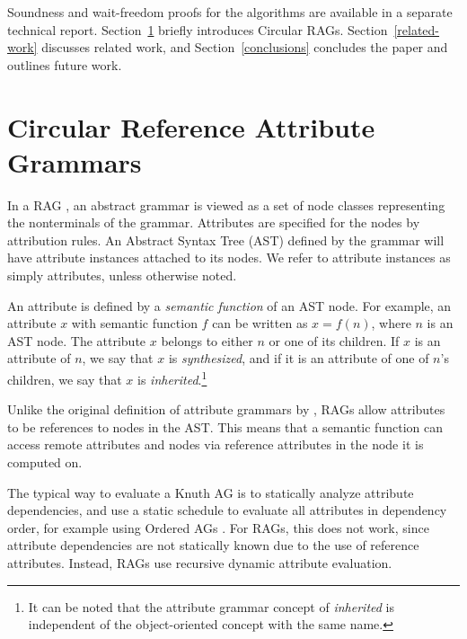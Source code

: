 {Soundness and wait-freedom proofs for the algorithms are available in a separate technical report.
Section~\ref{rags-background} briefly introduces Circular RAGs.
Section~\ref{related-work} discusses related work, and Section~\ref{conclusions} concludes the paper and outlines future work.


\section{Circular Reference Attribute Grammars}
\label{rags-background}


In a RAG \cite{DBLP:journals/informaticaSI/Hedin00}, an abstract grammar is
viewed as a set of node classes representing the nonterminals of the grammar.
Attributes are specified for the nodes by attribution rules.
An Abstract Syntax Tree (AST) defined by the grammar will have attribute instances
attached to its nodes.  We refer to attribute instances as simply attributes, unless otherwise noted.

An attribute is defined by a \emph{semantic function} of an AST node.
For example, an attribute $x$ with
semantic function $f$ can
be written as $x = f(n)$, where $n$ is an AST node.
The attribute $x$ belongs to either $n$ or one of its children.  If
$x$ is an attribute of $n$, we say that $x$ is
\emph{synthesized}, and if it is an attribute of one of $n$'s children, we
say that $x$ is \emph{inherited}.\footnote{It can be noted that the
attribute grammar concept of \emph{inherited} is independent of the
object-oriented concept with the same name.}

Unlike the original definition of attribute grammars by \textcite{DBLP:journals/mst/Knuth68},
RAGs allow attributes to be references to nodes in the AST.
This means that a semantic function can access remote attributes and nodes via reference
attributes in the node it is computed on.

The typical way to evaluate a Knuth AG is to statically analyze
attribute dependencies, and use a static schedule to evaluate all
attributes in dependency order, for example using Ordered AGs
\cite{DBLP:journals/acta/Kastens80}. For RAGs, this does not work, since attribute
dependencies are not statically known due to the use of reference attributes. Instead,
RAGs use recursive dynamic attribute evaluation.

}
